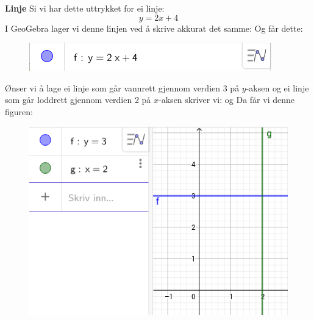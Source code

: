 \textbf{Linje}\bs
Si vi har dette uttrykket for ei linje:
\[ y = 2x+4 \]
I GeoGebra lager vi denne linjen ved å skrive akkurat det samme:
Og får dette:
\begin{figure}[H]
	\centering
	\includegraphics[scale=0.6]{lin1}
\end{figure}
Ønser vi å lage ei linje som går vannrett gjennom verdien 3 på $ y $-aksen og ei linje som går loddrett gjennom verdien 2 på $ x $-aksen skriver vi:
og 
Da får vi denne figuren:
\begin{figure}[H]
	\centering
	\includegraphics[scale=0.6]{23}
\end{figure}

